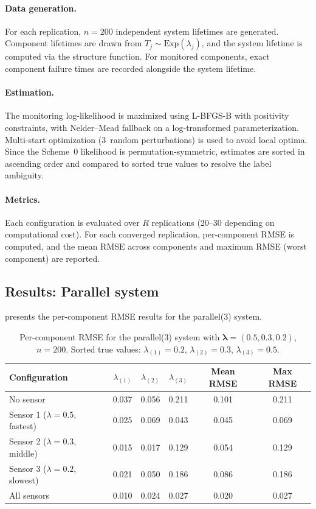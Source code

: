 \documentclass[12pt]{article}
\theoremstyle{definition}
\theoremstyle{remark}
\newcommand{\blam}{\boldsymbol{\lambda}}
\begin{document}
\paragraph{Data generation.}
For each replication, $n = 200$ independent system lifetimes are
generated.  Component lifetimes are drawn from
$T_j \sim \mathrm{Exp}(\lambda_j)$, and the system lifetime is
computed via the structure function.  For monitored components, exact
component failure times are recorded alongside the system lifetime.

\paragraph{Estimation.}
The monitoring log-likelihood is maximized using L-BFGS-B with
positivity constraints, with Nelder--Mead fallback on a
log-transformed parameterization.  Multi-start optimization
($3$~random perturbations) is used to avoid local optima.  Since the
Scheme~0 likelihood is permutation-symmetric, estimates are sorted
in ascending order and compared to sorted true values to resolve
the label ambiguity.

\paragraph{Metrics.}
Each configuration is evaluated over $R$ replications (20--30
depending on computational cost).  For each converged replication,
per-component RMSE is computed, and the mean RMSE across components
and maximum RMSE (worst component) are reported.

\subsection{Results: Parallel system}
\label{sec:results-parallel}

 presents the per-component RMSE results
for the parallel($3$) system.

\begin{table}[t]
\centering
\caption{Per-component RMSE for the parallel($3$) system with
$\blam = (0.5, 0.3, 0.2)$, $n = 200$.  Sorted true values:
$\lambda_{(1)} = 0.2$, $\lambda_{(2)} = 0.3$, $\lambda_{(3)} = 0.5$.}
\label{tab:parallel-results}
\begin{tabular}{lccccc}
  \toprule
  Configuration & $\lambda_{(1)}$ & $\lambda_{(2)}$ & $\lambda_{(3)}$ &
    Mean RMSE & Max RMSE \\
  \midrule
  No sensor                       & 0.037 & 0.056 & 0.211 & 0.101 & 0.211 \\
  Sensor 1 ($\lambda{=}0.5$, fastest) & 0.025 & 0.069 & 0.043 & 0.045 & 0.069 \\
  Sensor 2 ($\lambda{=}0.3$, middle)  & 0.015 & 0.017 & 0.129 & 0.054 & 0.129 \\
  Sensor 3 ($\lambda{=}0.2$, slowest) & 0.021 & 0.050 & 0.186 & 0.086 & 0.186 \\
  All sensors                     & 0.010 & 0.024 & 0.027 & 0.020 & 0.027 \\
  \bottomrule
\end{tabular}
\end{table}
\end{document}

